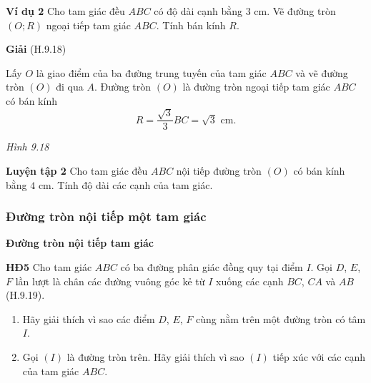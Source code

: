 \begin{lesson}
    \textbf{Ví dụ 2} Cho tam giác đều $ABC$ có độ dài cạnh bằng $3$ cm. Vẽ đường tròn $(O;R)$ ngoại tiếp tam giác $ABC$. Tính bán kính $R$.

    \textbf{Giải} (H.9.18)

    Lấy $O$ là giao điểm của ba đường trung tuyến của tam giác $ABC$ và vẽ đường tròn $(O)$ đi qua $A$. Đường tròn $(O)$ là đường tròn ngoại tiếp tam giác $ABC$ có bán kính
    \[
        R=\dfrac{\sqrt3}{3}BC=\sqrt3\text{ cm}.
    \]

    \begin{center}

    \textit{Hình 9.18}
    \end{center}

    \textbf{Luyện tập 2} Cho tam giác đều $ABC$ nội tiếp đường tròn $(O)$ có bán kính bằng $4$ cm. Tính độ dài các cạnh của tam giác.

    \answerline
    \answerline

    \subsubsection{Đường tròn nội tiếp một tam giác}

    \textbf{Đường tròn nội tiếp tam giác}

    \textbf{HĐ5} Cho tam giác $ABC$ có ba đường phân giác đồng quy tại điểm $I$. Gọi $D$, $E$, $F$ lần lượt là chân các đường vuông góc kẻ từ $I$ xuống các cạnh $BC$, $CA$ và $AB$ (H.9.19).
    \begin{enumerate}[label=\alph*)]
        \item Hãy giải thích vì sao các điểm $D$, $E$, $F$ cùng nằm trên một đường tròn có tâm $I$.

        \answerline
        \answerline
        \item Gọi $(I)$ là đường tròn trên. Hãy giải thích vì sao $(I)$ tiếp xúc với các cạnh của tam giác $ABC$.


\end{enumerate}
\end{lesson}
